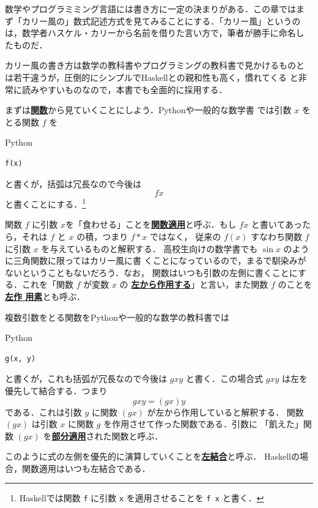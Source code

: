 \documentclass[a5paper,twoside,fleqn,draft]{jsbook}
\newcommand{\programminglanguage}[1]{\textsf{#1}}
\newcommand{\haskell}{\programminglanguage{Haskell}}
\newcommand{\python}{\programminglanguage{Python}}
\newcommand{\keyword}[1]{{\underline{\textbf{#1}}}}
\newcommand{\code}[1]{\texttt{#1}}
\newenvironment{pythoncode}{\begin{itembox}[r]{\python}}{\end{itembox}}
\begin{document}
数学やプログラミミング言語には書き方に一定の決まりがある．この章ではま
ず「カリー風の」数式記述方式を見てみることにする．「カリー風」というの
は，数学者ハスケル・カリーから名前を借りた言い方で，筆者が勝手に命名し
たものだ．

カリー風の書き方は数学の教科書やプログラミングの教科書で見かけるものと
は若干違うが，圧倒的にシンプルで\haskell との親和性も高く，慣れてくる
と非常に読みやすいものなので，本書でも全面的に採用する．

まずは\keyword{関数}から見ていくことにしよう．\python や一般的な数学書
では引数 $x$ をとる関数 $f$ を
\begin{pythoncode}
\begin{verbatim}
f(x)
\end{verbatim}
\end{pythoncode}
と書くが，括弧は冗長なので今後は
\begin{equation}
  fx
\end{equation}
と書くことにする．\footnote{\haskell では関数 \code{f} に引数 \code{x}
  を適用させることを \code{f x} と書く．}


関数 $f$ に引数 $x$を「食わせる」ことを\keyword{関数適用}と呼ぶ．もし
$fx$ と書いてあったら，それは $f$ と $x$ の積，つまり $f*x$ ではなく，
従来の $f(x)$ すなわち関数 $f$ に引数 $x$ を与えているものと解釈する．
高校生向けの数学書でも $\sin x$ のように三角関数に限ってはカリー風に書
くことになっているので，まるで馴染みがないということもないだろう．なお，
関数はいつも引数の左側に書くことにする．これを「関数 $f$ が変数 $x$ の
  \keyword{左から作用する}」と言い，また関数 $f$ のことを\keyword{左作
  用素}とも呼ぶ．

複数引数をとる関数を\python や一般的な数学の教科書では
\begin{pythoncode}
\begin{verbatim}
g(x, y)
\end{verbatim}
\end{pythoncode}
と書くが，これも括弧が冗長なので今後は $gxy$ と書く．この場合式 $gxy$
は左を優先して結合する．つまり
\begin{equation}
  gxy=(gx)y
\end{equation}
である．これは引数 $y$ に関数 $(gx)$ が左から作用していると解釈する．
関数 $(gx)$ は引数 $x$ に関数 $g$ を作用させて作った関数である．引数に
「飢えた」関数 $(gx)$ を\keyword{部分適用}された関数と呼ぶ．

このように式の左側を優先的に演算していくことを\keyword{左結合}と呼ぶ．
\haskell の場合，関数適用はいつも左結合である．
\end{document}
